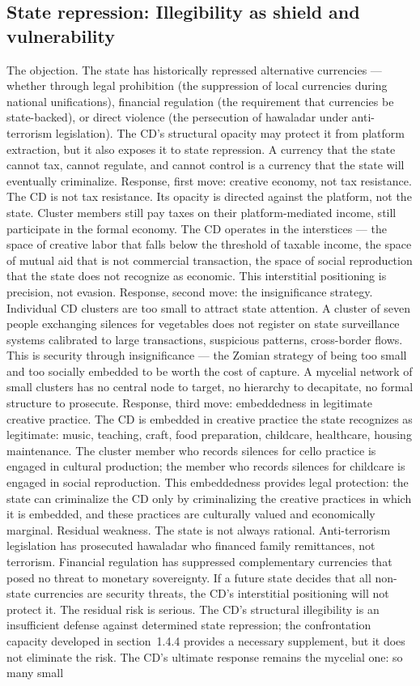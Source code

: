 \subsection{State repression: Illegibility as shield and vulnerability}

The objection. The state has historically repressed alternative currencies — whether through legal prohibition (the suppression of local currencies during national unifications), financial regulation (the requirement that currencies be state-backed), or direct violence (the persecution of hawaladar under anti-terrorism legislation). The CD’s structural opacity may protect it from platform extraction, but it also exposes it to state repression. A currency that the state cannot tax, cannot regulate, and cannot control is a currency that the state will eventually criminalize. Response, first move: creative economy, not tax resistance. The CD is not tax resistance. Its opacity is directed against the platform, not the state. Cluster members still pay taxes on their platform-mediated income, still participate in the formal economy. The CD operates in the interstices — the space of creative labor that falls below the threshold of taxable income, the space of mutual aid that is not commercial transaction, the space of social reproduction that the state does not recognize as economic. This interstitial positioning is precision, not evasion. Response, second move: the insignificance strategy. Individual CD clusters are too small to attract state attention. A cluster of seven people exchanging silences for vegetables does not register on state surveillance systems calibrated to large transactions, suspicious patterns, cross-border flows. This is security through insignificance — the Zomian strategy of being too small and too socially embedded to be worth the cost of capture. A mycelial network of small clusters has no central node to target, no hierarchy to decapitate, no formal structure to prosecute. Response, third move: embeddedness in legitimate creative practice. The CD is embedded in creative practice the state recognizes as legitimate: music, teaching, craft, food preparation, childcare, healthcare, housing maintenance. The cluster member who records silences for cello practice is engaged in cultural production; the member who records silences for childcare is engaged in social reproduction. This embeddedness provides legal protection: the state can criminalize the CD only by criminalizing the creative practices in which it is embedded, and these practices are culturally valued and economically marginal. Residual weakness. The state is not always rational. Anti-terrorism legislation has prosecuted hawaladar who financed family remittances, not terrorism. Financial regulation has suppressed complementary currencies that posed no threat to monetary sovereignty. If a future state decides that all non-state currencies are security threats, the CD’s interstitial positioning will not protect it. The residual risk is serious. The CD’s structural illegibility is an insufficient defense against determined state repression; the confrontation capacity developed in section~1.4.4 provides a necessary supplement, but it does not eliminate the risk. The CD's ultimate response remains the mycelial one: so many small 